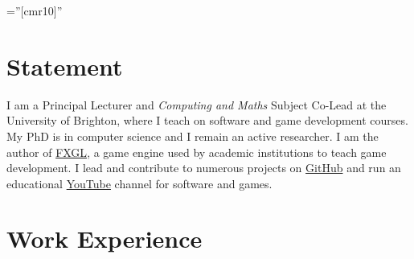 \documentclass[a4paper,11pt]{article} %
\begin{document}
\pagestyle{empty} %

\font\fb=''[cmr10]'' %


\par{\bigskip\par} %

\section{Statement}

I am a Principal Lecturer and \textit{Computing and Maths} Subject Co-Lead at the University of Brighton, where I teach on software and game development courses.
My PhD is in computer science and I remain an active researcher.
I am the author of \href{https://github.com/AlmasB/FXGL}{FXGL}, a game engine used by academic institutions to teach game development.
I lead and contribute to numerous projects on \href{https://github.com/AlmasB}{GitHub} and run an educational \href{https://www.youtube.com/almasb0/videos}{YouTube} channel for software and games.


\section{Work Experience}
\end{document}
